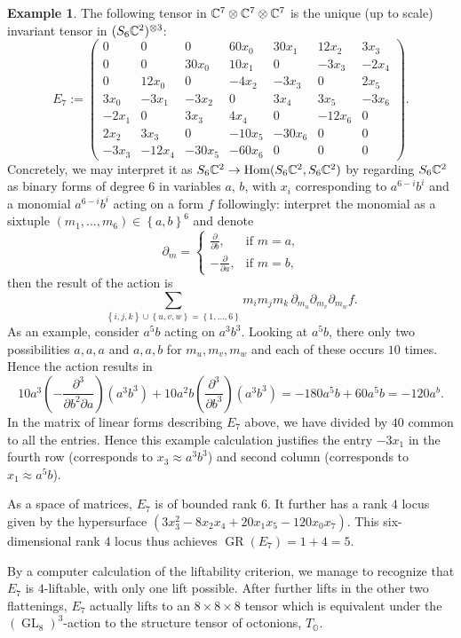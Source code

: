 \documentclass[a4paper,10pt]{article}
\def\oct{\mathbb O}
\def\zav#1{\left(#1\right)}
\def\set#1{\left\{#1\right\}}
\def\mtrx#1{\begin{pmatrix}#1\end{pmatrix}}
\DeclareMathOperator{\Hom}{Hom}\let\hom\Hom
\DeclareMathOperator{\GR}{GR}
\DeclareMathOperator{\GL}{GL}
\theoremstyle{definition}
\newtheorem{example}[theorem]{Example}
\theoremstyle{remark}
\begin{document}
\begin{example}
The following tensor in $\ce^7\otimes\ce^7\otimes\ce^7$ is the unique (up to scale) invariant tensor in $(S_6\ce^2)^{\otimes3}$:
\[
    E_7 := \mtrx{
        0 &      0 &      0 &  60x_0 &  30x_1 &  12x_2 &   3x_3 \\
        0 &      0 &  30x_0 &  10x_1 &      0 &  -3x_3 &  -2x_4 \\
        0 &  12x_0 &      0 &  -4x_2 &  -3x_3 &      0 &   2x_5 \\
        3x_0 &  -3x_1 &  -3x_2 &      0 &   3x_4 &   3x_5 &  -3x_6 \\
        -2x_1 &      0 &   3x_3 &   4x_4 &      0 & -12x_6 &      0 \\
        2x_2 &   3x_3 &      0 & -10x_5 & -30x_6 &      0 &      0 \\
        -3x_3 & -12x_4 & -30x_5 & -60x_6 &      0 &      0 &      0
    }.
\]
Concretely, we may interpret it as $S_6\ce^2\to \Hom(S_6\ce^2, S_6\ce^2)$ by regarding $S_6\ce^2$ as binary forms of degree $6$ in variables $a$, $b$, with $x_i$ corresponding to $a^{6-i}b^i$ and a monomial $a^{6-i}b^i$ acting on a form $f$ followingly: interpret the monomial as a sixtuple $(m_1,\dots,m_6)\in \set{a,b}^6$ and denote
\[
    \partial_m = \begin{cases}
        \frac{\partial}{\partial b}, & \text{if $m=a$,}\\
        -\frac{\partial}{\partial a}, & \text{if $m=b$,}
    \end{cases}
\]
then the result of the action is
\[
    \sum_{\set{i,j,k}\cup\set{u,v,w}=\set{1,\dots,6}} m_im_jm_k\, \partial_{m_u}\partial_{m_v}\partial_{m_w}f.
\]
As an example, consider $a^5b$ acting on $a^3b^3$. Looking at $a^5b$, there only two possibilities $a,a,a$ and $a,a,b$ for $m_u,m_v,m_w$ and each of these occurs $10$ times. Hence the action results in
\[
    10 a^3\zav{-\frac{\partial^3}{\partial b^2\partial a}} (a^3b^3) + 10a^2b \zav{\frac{\partial^3}{\partial b^3}} (a^3b^3) = -180a^5b + 60a^5b = -120a^b.
\]
In the matrix of linear forms describing $E_7$ above, we have divided by $40$ common to all the entries. Hence this example calculation justifies the entry $-3x_1$ in the fourth row (corresponds to $x_3\approx a^3b^3$) and second column (corresponds to $x_1\approx a^5b$).

As a space of matrices, $E_7$ is of bounded rank $6$. It further has a rank $4$ locus given by the hypersurface $(3x_3^2-8x_2x_4+20x_1x_5-120x_0x_7)$. This six-dimensional rank $4$ locus thus achieves $\GR(E_7) = 1+4=5$.

By a computer calculation of the liftability criterion, we manage to recognize that $E_7$ is $4$-liftable, with only one lift possible. After further lifts in the other two flattenings, $E_7$ actually lifts to an $8\times 8\times 8$ tensor which is equivalent under the $(\GL_8)^3$-action to the structure tensor of octonions, $T_{\oct}$.
\end{example}
\end{document}
